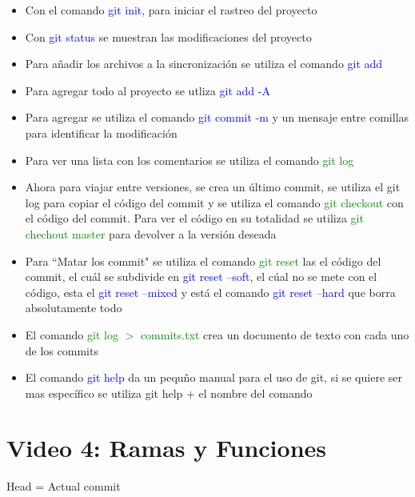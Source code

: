\documentclass{article}
\begin{document}
	\begin{itemize}
		\item Con el comando \textcolor{blue}{git init}, para iniciar el rastreo del proyecto
		\item Con \textcolor{blue}{git status} se muestran las modificaciones del proyecto
		\item Para añadir los archivos a la sincronización se utiliza el comando \textcolor{blue}{git add}
		\item Para agregar todo al proyecto se utliza \textcolor{blue}{git add -A}
		\item Para agregar se utiliza el comando \textcolor{blue}{git commit -m} y un mensaje entre comillas para identificar la modificación
		\item Para ver una lista con los comentarios se utiliza el comando \textcolor{green}{git log}
		\item Ahora para viajar entre versiones, se crea un último commit, se utiliza el git log para copiar el código del commit y se utiliza el comando \textcolor{green}{git checkout} con el código del commit. Para ver el código en su totalidad se utiliza \textcolor{green}{git chechout master} para devolver a la versión deseada
		\item Para ``Matar los commit" se utiliza el comando \textcolor{green}{git reset} las el código del commit, el cuál se subdivide en \textcolor{blue}{git reset --soft}, el cúal no se mete con el código, esta el \textcolor{blue}{git reset --mixed} y está el comando \textcolor{blue}{git reset --hard} que borra absolutamente todo
		\item El comando \textcolor{green}{git log $>$ commits.txt} crea un documento de texto con cada uno de los commits
		\item El comando \textcolor{blue}{git help} da un pequño manual para el uso de git, si se quiere ser mas específico se utiliza git help + el nombre del comando
		
	\end{itemize}


	\section{Video 4: Ramas y Funciones}
	
	Head = Actual commit
	
\end{document}
